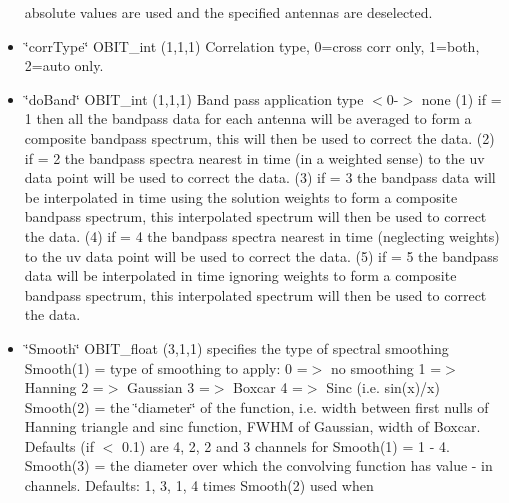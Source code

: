 \begin{itemize}
absolute values are used and the specified antennas are deselected. \item \char`\"{}corr\-Type\char`\"{} OBIT\_\-int (1,1,1) Correlation type, 0=cross corr only, 1=both, 2=auto only. \item \char`\"{}do\-Band\char`\"{} OBIT\_\-int (1,1,1) Band pass application type $<$0-$>$ none (1) if = 1 then all the bandpass data for each antenna will be averaged to form a composite bandpass spectrum, this will then be used to correct the data. (2) if = 2 the bandpass spectra nearest in time (in a weighted sense) to the uv data point will be used to correct the data. (3) if = 3 the bandpass data will be interpolated in time using the solution weights to form a composite bandpass spectrum, this interpolated spectrum will then be used to correct the data. (4) if = 4 the bandpass spectra nearest in time (neglecting weights) to the uv data point will be used to correct the data. (5) if = 5 the bandpass data will be interpolated in time ignoring weights to form a composite bandpass spectrum, this interpolated spectrum will then be used to correct the data. \item \char`\"{}Smooth\char`\"{} OBIT\_\-float (3,1,1) specifies the type of spectral smoothing Smooth(1) = type of smoothing to apply: 0 =$>$ no smoothing 1 =$>$ Hanning 2 =$>$ Gaussian 3 =$>$ Boxcar 4 =$>$ Sinc (i.e. sin(x)/x) Smooth(2) = the \char`\"{}diameter\char`\"{} of the function, i.e. width between first nulls of Hanning triangle and sinc function, FWHM of Gaussian, width of Boxcar. Defaults (if $<$ 0.1) are 4, 2, 2 and 3 channels for Smooth(1) = 1 - 4. Smooth(3) = the diameter over which the convolving function has value - in channels. Defaults: 1, 3, 1, 4 times Smooth(2) used when\end{itemize}

